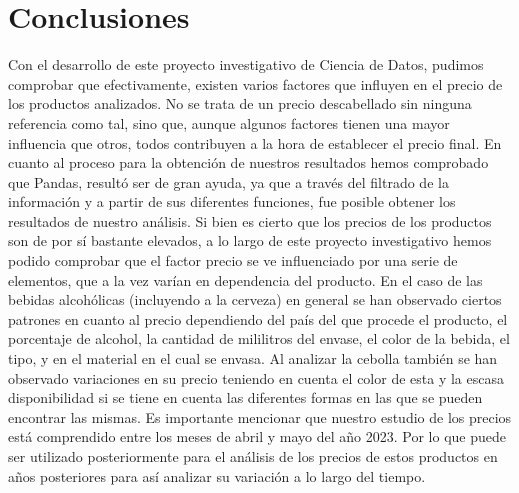 \documentclass[a4paper,12pt]{article}
\begin{document}
	\section{Conclusiones}
	Con el desarrollo de este proyecto investigativo de Ciencia de Datos, pudimos comprobar que efectivamente, existen varios factores que influyen en el precio de los productos analizados. No se trata de un precio descabellado sin ninguna referencia como tal, sino que, aunque algunos factores tienen una mayor influencia que otros, todos contribuyen a la hora de establecer el precio final. En cuanto al proceso para la obtención de nuestros resultados hemos comprobado que Pandas, resultó ser de gran ayuda, ya que a través del filtrado de la información y a partir de sus diferentes funciones, fue posible obtener los resultados de nuestro análisis. Si bien es cierto que los precios de los productos son de por sí bastante elevados, a lo largo de este proyecto investigativo hemos podido comprobar que el factor precio se ve influenciado por una serie de elementos, que a la vez varían en dependencia del producto. En el caso de las bebidas alcohólicas (incluyendo a la cerveza) en general se han observado ciertos patrones en cuanto al precio dependiendo del país del que procede el producto, el porcentaje de alcohol, la cantidad de mililitros del envase, el color de la bebida, el tipo, y en el material en el cual se envasa. Al analizar la cebolla también se han observado variaciones en su precio teniendo en cuenta el color de esta y la escasa disponibilidad si se tiene en cuenta las diferentes formas en las que se pueden encontrar las mismas. Es importante mencionar que nuestro estudio de los precios está comprendido entre los meses de abril y mayo del año 2023. Por lo que puede ser utilizado posteriormente para el análisis de los precios de estos productos en años posteriores para así analizar su variación a lo largo del tiempo.
	
\end{document}
